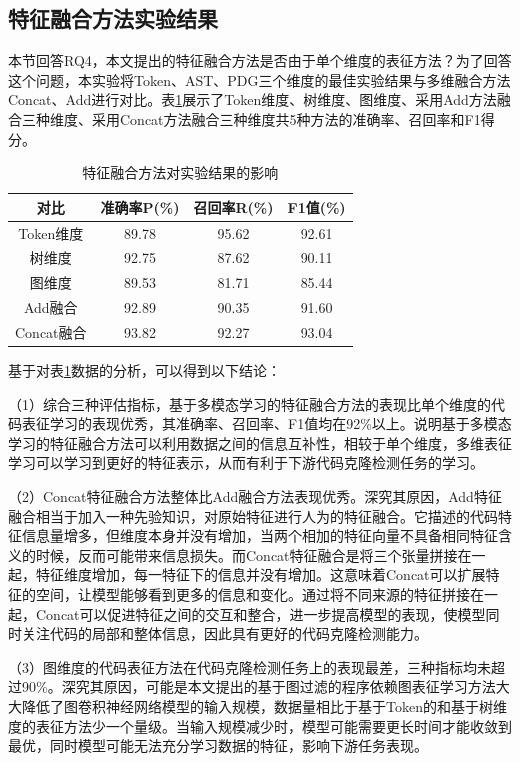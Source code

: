 \subsection{特征融合方法实验结果}

本节回答RQ4，本文提出的特征融合方法是否由于单个维度的表征方法？为了回答这个问题，本实验将Token、AST、PDG三个维度的最佳实验结果与多维融合方法Concat、Add进行对比。表\ref{tab:concat}展示了Token维度、树维度、图维度、采用Add方法融合三种维度、采用Concat方法融合三种维度共5种方法的准确率、召回率和F1得分。

\begin{table}[htp]
  \centering
  \caption{特征融合方法对实验结果的影响}
  \label{tab:concat}
  \begin{tabular*}{0.9\textwidth}{@{\extracolsep{\fill}}cccc}
  \toprule
    对比			& 准确率P(\%) & 召回率R(\%) & F1值(\%)  \\ 
  \midrule
    Token维度			   & 89.78	  & 95.62	  & 92.61	   \\  
    树维度		       & 92.75	  & 87.62	  & 90.11   \\ 
    图维度			     & 89.53		& 81.71		& 85.44   \\
    Add融合			     & 92.89		& 90.35		& 91.60   \\
    Concat融合     	 & 93.82		& 92.27		& 93.04  \\
  \bottomrule
  \end{tabular*}
\end{table}


基于对表\ref{tab:concat}数据的分析，可以得到以下结论：

（1）综合三种评估指标，基于多模态学习的特征融合方法的表现比单个维度的代码表征学习的表现优秀，其准确率、召回率、F1值均在92\%以上。说明基于多模态学习的特征融合方法可以利用数据之间的信息互补性，相较于单个维度，多维表征学习可以学习到更好的特征表示，从而有利于下游代码克隆检测任务的学习。

（2）Concat特征融合方法整体比Add融合方法表现优秀。深究其原因，Add特征融合相当于加入一种先验知识，对原始特征进行人为的特征融合。它描述的代码特征信息量增多，但维度本身并没有增加，当两个相加的特征向量不具备相同特征含义的时候，反而可能带来信息损失。而Concat特征融合是将三个张量拼接在一起，特征维度增加，每一特征下的信息并没有增加。这意味着Concat可以扩展特征的空间，让模型能够看到更多的信息和变化。通过将不同来源的特征拼接在一起，Concat可以促进特征之间的交互和整合，进一步提高模型的表现，使模型同时关注代码的局部和整体信息，因此具有更好的代码克隆检测能力。

（3）图维度的代码表征方法在代码克隆检测任务上的表现最差，三种指标均未超过90\%。深究其原因，可能是本文提出的基于图过滤的程序依赖图表征学习方法大大降低了图卷积神经网络模型的输入规模，数据量相比于基于Token的和基于树维度的表征方法少一个量级。当输入规模减少时，模型可能需要更长时间才能收敛到最优，同时模型可能无法充分学习数据的特征，影响下游任务表现。

